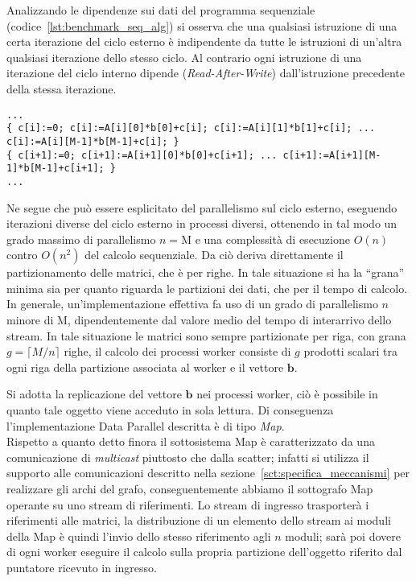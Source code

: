 Analizzando le dipendenze sui dati del programma sequenziale (codice~\ref{lst:benchmark_seq_alg}) si osserva che una qualsiasi istruzione di una certa iterazione del ciclo esterno \`e indipendente da tutte le istruzioni di un'altra qualsiasi iterazione dello stesso ciclo. Al contrario ogni istruzione di una iterazione del ciclo interno dipende (\emph{Read-After-Write}) dall'istruzione precedente della stessa iterazione.
\begin{lstlisting}[caption={Rappresentazione delle istruzioni di due cicli esterni contigui.}]
...
{ c[i]:=0; c[i]:=A[i][0]*b[0]+c[i]; c[i]:=A[i][1]*b[1]+c[i]; ... c[i]:=A[i][M-1]*b[M-1]+c[i]; }
{ c[i+1]:=0; c[i+1]:=A[i+1][0]*b[0]+c[i+1]; ... c[i+1]:=A[i+1][M-1]*b[M-1]+c[i+1]; }
...
\end{lstlisting}
Ne segue che pu\`o essere esplicitato del parallelismo sul ciclo esterno, eseguendo iterazioni diverse del ciclo esterno in processi diversi, ottenendo in tal modo un grado massimo di parallelismo $n = \textrm{M}$ e una complessit\`a di esecuzione $O(n)$ contro $O(n^2)$ del calcolo sequenziale. Da ci\`o deriva direttamente il partizionamento delle matrici, che \`e per righe. In tale situazione si ha la ``grana'' minima sia per quanto riguarda le partizioni dei dati, che per il tempo di calcolo.
In generale, un'implementazione effettiva fa uso di un grado di parallelismo $n$ minore di M, dipendentemente dal valore medio del tempo di interarrivo dello stream. In tale situazione le matrici sono sempre partizionate per riga, con grana $g = \lceil M / n \rceil$ righe, il calcolo dei processi worker consiste di $g$ prodotti scalari tra ogni riga della partizione associata al worker e il vettore $\mathbf{b}$. 

Si adotta la replicazione del vettore $\mathbf{b}$ nei processi worker, ci\`o \`e possibile in quanto tale oggetto viene acceduto in sola lettura. Di conseguenza l'implementazione Data Parallel descritta \`e di tipo \emph{Map}. \\

Rispetto a quanto detto finora il sottosistema Map \`e caratterizzato da una comunicazione di \emph{multicast} piuttosto che dalla scatter; infatti si utilizza il supporto alle comunicazioni descritto nella sezione~\ref{sct:specifica_meccanismi} per realizzare gli archi del grafo,
 conseguentemente abbiamo il sottografo Map operante su uno stream di riferimenti. Lo stream di ingresso trasporter\`a i riferimenti alle matrici, la distribuzione di un elemento dello stream ai moduli della Map \`e quindi l'invio dello stesso riferimento agli $n$ moduli; sar\`a poi dovere di ogni worker eseguire il calcolo sulla propria partizione dell'oggetto riferito dal puntatore ricevuto in ingresso. \\

